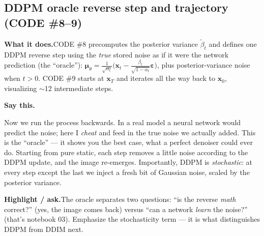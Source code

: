 \documentclass[11pt]{article}
\newenvironment{saythis}{%
  \par\smallskip\noindent
  \begin{list}{}{%
    \setlength{\leftmargin}{1.2em}%
    \setlength{\rightmargin}{0.5em}%
    \setlength{\topsep}{2pt}%
  }\item\relax
  \color{sayrule}\textbf{Say this.}\hspace{0.4em}\color{black}\itshape
}{%
  \end{list}\par\smallskip
}
\newcommand{\highlight}[1]{\par\smallskip\noindent\textcolor{hlcolor}{\textbf{Highlight / ask.}}\hspace{0.4em}#1\par\smallskip}
\newcommand{\whatdoes}[1]{\par\noindent\textbf{What it does.}\hspace{0.4em}#1\par}
\begin{document}
\subsection{DDPM oracle reverse step and trajectory (CODE \#8--9)}
\whatdoes{CODE \#8 precomputes the posterior variance $\tilde\beta_t$ and defines one DDPM reverse step
using the \emph{true} stored noise as if it were the network prediction (the ``oracle''):
$\boldsymbol\mu_\theta = \frac{1}{\sqrt{\alpha_t}}\big(\mathbf{x}_t - \frac{\beta_t}{\sqrt{1-\bar\alpha_t}}\boldsymbol\varepsilon\big)$,
plus posterior-variance noise when $t>0$. CODE \#9 starts at $\mathbf{x}_T$ and iterates all the way
back to $\mathbf{x}_0$, visualizing $\sim$12 intermediate steps.}
\begin{saythis}
Now we run the process backwards. In a real model a neural network would predict the noise; here I
\emph{cheat} and feed in the true noise we actually added. This is the ``oracle'' --- it shows you the
best case, what a perfect denoiser could ever do. Starting from pure static, each step removes a
little noise according to the DDPM update, and the image re-emerges. Importantly, DDPM is
\emph{stochastic}: at every step except the last we inject a fresh bit of Gaussian noise, scaled by the
posterior variance.
\end{saythis}
\highlight{The oracle separates two questions: ``is the reverse \emph{math} correct?'' (yes, the image
comes back) versus ``can a network \emph{learn} the noise?'' (that's notebook 03). Emphasize the
stochasticity term --- it is what distinguishes DDPM from DDIM next.}
\end{document}

